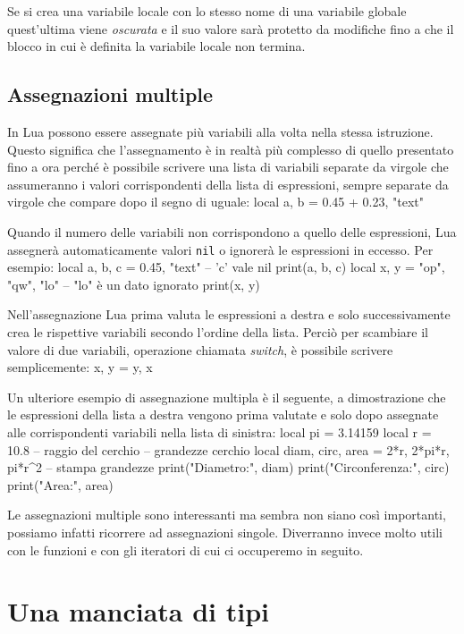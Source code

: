 Se si crea una variabile locale con lo stesso nome di una variabile globale
quest'ultima viene \emph{oscurata} e il suo valore sarà protetto da modifiche
fino a che il blocco in cui è definita la variabile locale non termina.


\subsection{Assegnazioni multiple}

In Lua possono essere assegnate più variabili alla volta nella stessa
istruzione. Questo significa che l'assegnamento è in realtà più complesso di
quello presentato fino a ora perché è possibile scrivere una lista di variabili
separate da virgole che assumeranno i valori corrispondenti della lista di
espressioni, sempre separate da virgole che compare dopo il segno di uguale:
\lines
local a, b = 0.45 + 0.23, "text"
\endlines
{}

Quando il numero delle variabili non corrispondono a quello delle espressioni,
Lua assegnerà automaticamente valori \texttt{nil} o ignorerà le espressioni in
eccesso. Per esempio:
\lines
local a, b, c = 0.45, "text"    -- 'c' vale nil
print(a, b, c)
local x, y = "op", "qw", "lo"   -- "lo" è un dato ignorato
print(x, y)
\endlines
{}

Nell'assegnazione Lua prima valuta le espressioni a destra e solo
successivamente crea le rispettive variabili secondo l'ordine della lista.
Perciò per scambiare il valore di due variabili, operazione chiamata
\emph{switch}, è possibile scrivere semplicemente:
\lines
x, y = y, x
\endlines
{}

Un ulteriore esempio di assegnazione multipla è il seguente, a dimostrazione
che le espressioni della lista a destra vengono prima valutate e solo dopo
assegnate alle corrispondenti variabili nella lista di sinistra:
\lines
local pi = 3.14159
local r = 10.8 -- raggio del cerchio
-- grandezze cerchio
local diam, circ, area = 2*r, 2*pi*r, pi*r^2
-- stampa grandezze
print("Diametro:", diam)
print("Circonferenza:", circ)
print("Area:", area)
\endlines
{}

Le assegnazioni multiple sono interessanti ma sembra non siano così importanti,
possiamo infatti ricorrere ad assegnazioni singole. Diverranno invece molto
utili con le funzioni e con gli iteratori di cui ci occuperemo in seguito.


\section{Una manciata di tipi}

